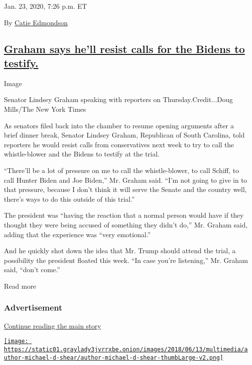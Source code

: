 Jan. 23, 2020, 7:26 p.m. ET

By \href{https://www.nytimes3xbfgragh.onion/by/catie-edmondson}{Catie
Edmondson}

\hypertarget{graham-says-hell-resist-calls-for-the-bidens-to-testify}{%
\subsection{\texorpdfstring{\protect\hyperlink{graham-says-hell-resist-calls-for-the-bidens-to-testify}{Graham
says he'll resist calls for the Bidens to
testify.}}{Graham says he'll resist calls for the Bidens to testify.}}\label{graham-says-hell-resist-calls-for-the-bidens-to-testify}}

Image

Senator Lindsey Graham speaking with reporters on Thursday.Credit...Doug
Mills/The New York Times

As senators filed back into the chamber to resume opening arguments
after a brief dinner break, Senator Lindsey Graham, Republican of South
Carolina, told reporters he would resist calls from conservatives next
week to try to call the whistle-blower and the Bidens to testify at the
trial.

``There'll be a lot of pressure on me to call the whistle-blower, to
call Schiff, to call Hunter Biden and Joe Biden,'' Mr. Graham said.
``I'm not going to give in to that pressure, because I don't think it
will serve the Senate and the country well, there's ways to do this
outside of this trial.''

The president was ``having the reaction that a normal person would have
if they thought they were being accused of something they didn't do,''
Mr. Graham said, adding that the experience was ``very emotional.''

And he quickly shot down the idea that Mr. Trump should attend the
trial, a possibility the president floated this week. ``In case you're
listening,'' Mr. Graham said, ``don't come.''

Read more

\hypertarget{advertisement-1}{%
\subsubsection{Advertisement}\label{advertisement-1}}

\protect\hyperlink{after-dfp-ad-mid2}{Continue reading the main story}

\href{https://www.nytimes3xbfgragh.onion/by/michael-d-shear}{\texttt{[image: https://static01.graylady3jvrrxbe.onion/images/2018/06/13/multimedia/author-michael-d-shear/author-michael-d-shear-thumbLarge-v2.png]}}

